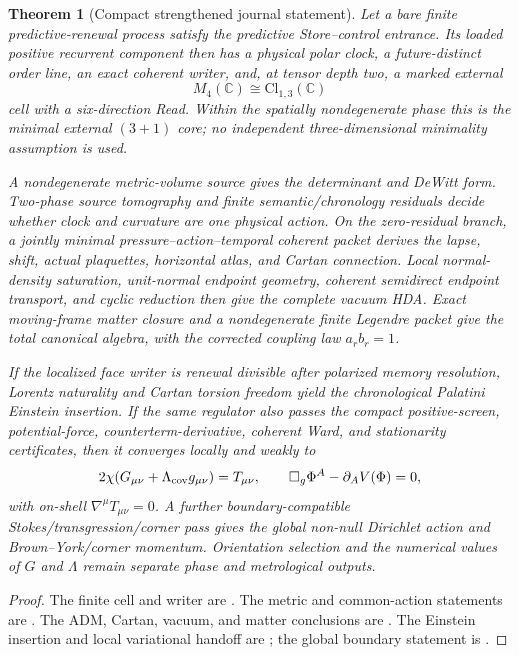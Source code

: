 \documentclass[11pt]{article}
\newtheorem{theorem}{Theorem}[section]
\theoremstyle{definition}
\theoremstyle{remark}
\newcommand{\C}{\mathbb C}
\newcommand{\Cl}{\mathrm{Cl}}
\begin{document}
\begin{theorem}[Compact strengthened journal statement]
\label{thm:compact-journal}
Let a bare finite predictive-renewal process satisfy the predictive
Store--control entrance.  Its loaded positive recurrent component then has a
physical polar clock, a future-distinct order line, an exact coherent writer,
and, at tensor depth two, a marked external
\[
 M_4(\C)\cong\Cl_{1,3}(\C)
\]
cell with a six-direction Read.  Within the spatially nondegenerate phase this
is the minimal external \((3+1)\) core; no independent three-dimensional
minimality assumption is used.

A nondegenerate metric-volume source gives the determinant and DeWitt form.
Two-phase source tomography and finite semantic/chronology residuals decide
whether clock and curvature are one physical action.  On the zero-residual
branch, a jointly minimal pressure--action--temporal coherent packet derives
the lapse, shift, actual plaquettes, horizontal atlas, and Cartan connection.
Local normal-density saturation, unit-normal endpoint geometry, coherent
semidirect endpoint transport, and cyclic reduction then give the complete
vacuum HDA.  Exact moving-frame matter closure and a nondegenerate finite
Legendre packet give the total canonical algebra, with the corrected coupling
law \(a_rb_r=1\).

If the localized face writer is renewal divisible after polarized memory
resolution, Lorentz naturality and Cartan torsion freedom yield the
chronological Palatini Einstein insertion.  If the same regulator also passes
the compact positive-screen, potential-force, counterterm-derivative,
coherent Ward, and stationarity certificates, then it converges locally and
weakly to
\[
 2\chi(G_{\mu\nu}+\Lambda_{\rm cov}g_{\mu\nu})=T_{\mu\nu},
 \qquad
 \Box_g\Phi^A-\partial_AV(\Phi)=0,
\]
with on-shell \(\nabla^\mu T_{\mu\nu}=0\).  A further boundary-compatible
Stokes/transgression/corner pass gives the global non-null Dirichlet action and
Brown--York/corner momentum.  Orientation selection and the numerical values
of \(G\) and \(\Lambda\) remain separate phase and metrological outputs.
\end{theorem}

\begin{proof}
The finite cell and writer are
.  The
metric and common-action statements are
.  The
ADM, Cartan, vacuum, and matter conclusions are
.
The Einstein insertion and local variational handoff are
; the
global boundary statement is .
\end{proof}
\end{document}
